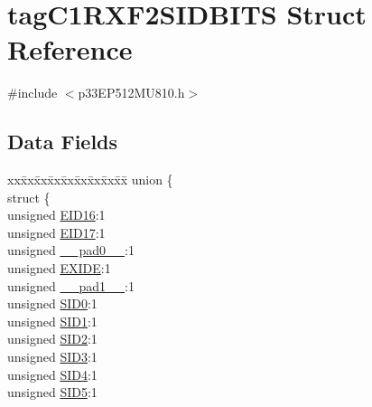 \hypertarget{structtag_c1_r_x_f2_s_i_d_b_i_t_s}{}\section{tag\+C1\+R\+X\+F2\+S\+I\+D\+B\+I\+TS Struct Reference}
\label{structtag_c1_r_x_f2_s_i_d_b_i_t_s}


{\ttfamily \#include $<$p33\+E\+P512\+M\+U810.\+h$>$}

\subsection*{Data Fields}
\begin{DoxyCompactItemize}
\item 
\begin{tabbing}
xx\=xx\=xx\=xx\=xx\=xx\=xx\=xx\=xx\=\kill
union \{\\
\>struct \{\\
\>\>unsigned \hyperlink{structtag_c1_r_x_f2_s_i_d_b_i_t_s_a6dd5663b0c9838c56db040560ca0efa1}{EID16}:1\\
\>\>unsigned \hyperlink{structtag_c1_r_x_f2_s_i_d_b_i_t_s_aa648615464b0eb29967529333eee9fd9}{EID17}:1\\
\>\>unsigned \hyperlink{structtag_c1_r_x_f2_s_i_d_b_i_t_s_adf71f3d8410c1f1dbbc96680a92c49af}{\_\_pad0\_\_}:1\\
\>\>unsigned \hyperlink{structtag_c1_r_x_f2_s_i_d_b_i_t_s_a09ff1c1be3927220bd3dfbc10edfe243}{EXIDE}:1\\
\>\>unsigned \hyperlink{structtag_c1_r_x_f2_s_i_d_b_i_t_s_acaf2d0924a107ec6e8d2e31febaf66f9}{\_\_pad1\_\_}:1\\
\>\>unsigned \hyperlink{structtag_c1_r_x_f2_s_i_d_b_i_t_s_a1ca276ac15df60e1f7b9a6d0011ade93}{SID0}:1\\
\>\>unsigned \hyperlink{structtag_c1_r_x_f2_s_i_d_b_i_t_s_a3405d354f81391f879648f69f504dfc8}{SID1}:1\\
\>\>unsigned \hyperlink{structtag_c1_r_x_f2_s_i_d_b_i_t_s_ad744966dfc49307f731b7045b01b94e5}{SID2}:1\\
\>\>unsigned \hyperlink{structtag_c1_r_x_f2_s_i_d_b_i_t_s_a9345f3e64720be93e83d8dfc827f3f45}{SID3}:1\\
\>\>unsigned \hyperlink{structtag_c1_r_x_f2_s_i_d_b_i_t_s_aefb106fed4bb40e2c3c71ac612c554e3}{SID4}:1\\
\>\>unsigned \hyperlink{structtag_c1_r_x_f2_s_i_d_b_i_t_s_a0f221b3c9612231686bf87ccdcec8489}{SID5}:1\\

\end{tabbing}
\end{DoxyCompactItemize}
